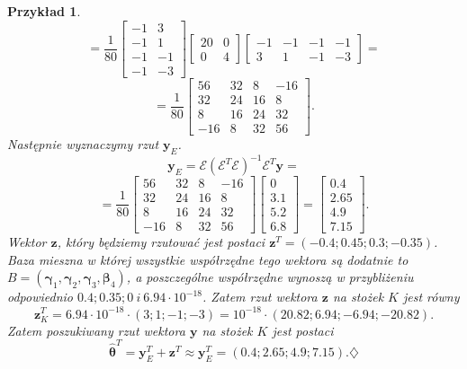 \documentclass[12pt]{mwart}
\newtheorem{prz}{Przykład}
\begin{document}
\begin{prz}
$$
=\frac{1}{80}\left[\begin{array}{cc}-1&3\\-1&1\\-1&-1\\-1&-3\end{array}\right] \left[\begin{array}{cc}20&0\\0&4\end{array}\right]\left[\begin{array}{cccc}-1&-1&-1&-1\\3&1&-1&-3\end{array}\right]=
$$
$$
=\frac{1}{80}\left[\begin{array}{cccc}56&32&8&-16\\32&24&16&8\\8&16&24&32\\-16&8&32&56\end{array}\right].
$$
Następnie wyznaczymy rzut $\pmb{y}_E$.
$$\pmb{y}_E=\mathcal{E}(\mathcal{E}^T\mathcal{E})^{-1}\mathcal{E}^T\pmb{y}=$$
$$=\frac{1}{80}\left[\begin{array}{cccc}56&32&8&-16\\32&24&16&8\\8&16&24&32\\-16&8&32&56\end{array}\right]\left[\begin{array}{c}0\\3.1\\5.2\\6.8\end{array}\right]=\left[\begin{array}{c}0.4\\2.65\\4.9\\7.15\end{array}\right].$$
Wektor $\pmb{z}$, który będziemy rzutować jest postaci $\pmb{z}^T=(-0.4;0.45;0.3;-0.35)$. Baza mieszna w której wszystkie współrzędne tego wektora są dodatnie to $B=(\pmb{\gamma}_1,\pmb{\gamma}_2,\pmb{\gamma}_3,\pmb{\beta}_4)$, a poszczególne współrzędne wynoszą w przybliżeniu odpowiednio $0.4;0.35;0\ i\ 6.94\cdot 10^{-18}$. Zatem rzut wektora $\pmb{z}$ na stożek $K$ jest równy $$\pmb{z}_{K}^T=6.94\cdot 10^{-18}\cdot(3;1;-1;-3)=10^{-18}\cdot(20.82;6.94;-6.94;-20.82).$$
Zatem poszukiwany rzut wektora $\pmb{y}$ na stożek $K$ jest postaci
$$
\hat{\pmb{\theta}}^T=\pmb{y}_E^T+\pmb{z}^T\approx \pmb{y}_E^T=(0.4;2.65;4.9;7.15).\diamondsuit
$$
\end{prz}
\end{document}
